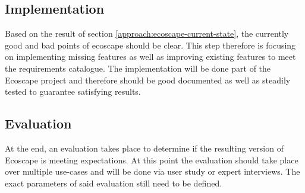 \subsection{Implementation}\label{approach:ecoscape-implementation}
Based on the result of section \ref{approach:ecoscape-current-state}, the currently good and bad points of ecoscape should be clear. This step therefore is focusing on implementing missing features as well as improving existing features 
to meet the requirements catalogue.
The implementation will be done part of the Ecoscape project and therefore should be good documented as well as steadily tested to guarantee satisfying results. 

\subsection{Evaluation}\label{approach:ecoscape-evaluation}
At the end, an evaluation takes place to determine if the resulting version of Ecoscape is meeting expectations. At this point the evaluation should take place over multiple use-cases and will be done via user study or expert interviews.
The exact parameters of said evaluation still need to be defined.